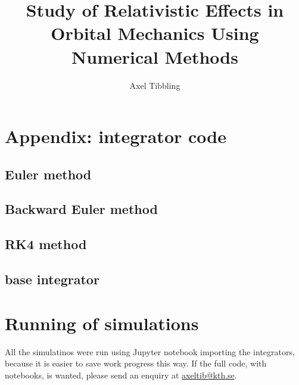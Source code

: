 \documentclass[11pt]{article}
\title{Study of Relativistic Effects in Orbital Mechanics Using Numerical Methods}
\author{Axel Tibbling}
\date{ }
\begin{document}
\maketitle

%
%
%
%
%
%
%
%
%


\begin{appendices}
\section{Appendix: integrator code}

\subsection{Euler method}


\subsection{Backward Euler method}


\subsection{RK4 method}


\subsection{base integrator}


\section{Running of simulations}
All the simulatinos were run using Jupyter notebook importing the integrators, because it is easier to save work progress this way. If the full code, with notebooks, is wanted, please send an enquiry at \href{mailto:axeltib@kth.se}{axeltib@kth.se}. 

\end{appendices}
\end{document}
